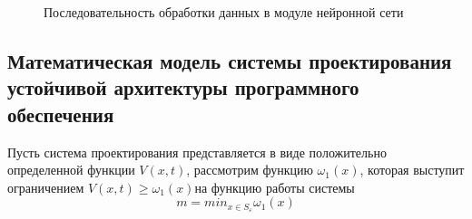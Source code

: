 \begin{figure}[ht]
    \caption{Последовательность обработки данных в модуле нейронной сети}\label{fig:NN2}
\end{figure}



\subsection{Математическая модель системы проектирования устойчивой архитектуры программного обеспечения}\label{sec:ch2/sec3/sub1}
Пусть система проектирования представляется в виде положительно определенной функции $V(x,t)$, рассмотрим функцию $\omega_1(x)$, которая выступит ограничением $V(x,t) \geq \omega_1(x)$на функцию работы системы
\begin{equation}
    \label{eq:equation49}
    m = min_{x \in S_{\varepsilon}}\omega_1(x)
\end{equation}


